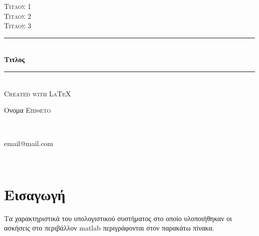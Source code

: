 \documentclass[a4paper,11pt]{article}
\begin{document}
\begin{titlepage}
	\newcommand{\HRule}{\rule{\linewidth}{0.5mm}} %
	\center
	
	\textsc{\LARGE Τιτλος 1}\\[1.5cm] %
	\textsc{\Large Τιτλος 2}\\[0.5cm] %
	\textsc{\large Τιτλος 3}\\[10ex] %

	\HRule \\[0.4cm]
	{ \huge \bfseries Τιτλος}\\[0.4cm] %
	\HRule \\[1.5cm]
 	
	\textsc{Created with \LaTeX}
	
	\vfill 
	\begin{minipage}{0.4\textwidth}
	\begin{flushleft} \large
	Ονομα \textsc{Επιθετο} 
	\end{flushleft}
	\end{minipage}
	~
	\begin{minipage}{0.4\textwidth}
	\begin{flushright} \large
	email@mail.com
	\end{flushright}
	\end{minipage}\\[4cm]
	\pagebreak
	
\end{titlepage}

\clearpage{\thispagestyle{empty}}\mbox{}\clearpage 
\tableofcontents{ \thispagestyle{empty}}
\newpage


\renewcommand\thesection{}
\section{Εισαγωγή}
	Τα χαρακτηριστικά του υπολογιστικού συστήματος στο οποίο υλοποιήθηκαν οι ασκήσεις στο περιβάλλον matlab περιγράφονται στον παρακάτω πίνακα. \\
\end{document}
